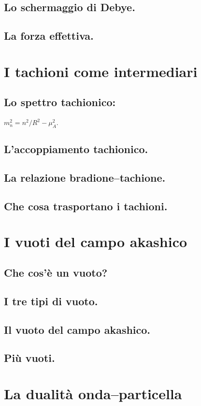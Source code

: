 \subsection{Lo schermaggio di Debye.}
\subsection{La forza effettiva.}

\section{I tachioni come intermediari}
\subsection{Lo spettro tachionico:} $m_n^2 = n^2/R^2 - \mu_A^2$.
\subsection{L'accoppiamento tachionico.}
\subsection{La relazione bradione--tachione.}
\subsection{Che cosa trasportano i tachioni.}

\section{I vuoti del campo akashico}
\subsection{Che cos'è un vuoto?}
\subsection{I tre tipi di vuoto.}
\subsection{Il vuoto del campo akashico.}
\subsection{Più vuoti.}

\section{La dualità onda--particella}
